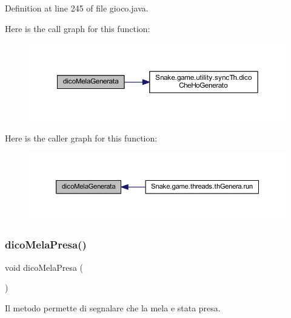 Definition at line 245 of file gioco.\+java.

Here is the call graph for this function\+:
\nopagebreak
\begin{figure}[H]
\begin{center}
\leavevmode
\includegraphics[width=350pt]{class_snake_1_1game_1_1gioco_a0de00fa3994a64cc918edd5944ac2569_cgraph}
\end{center}
\end{figure}
Here is the caller graph for this function\+:
\nopagebreak
\begin{figure}[H]
\begin{center}
\leavevmode
\includegraphics[width=350pt]{class_snake_1_1game_1_1gioco_a0de00fa3994a64cc918edd5944ac2569_icgraph}
\end{center}
\end{figure}
\mbox{\label{class_snake_1_1game_1_1gioco_a5309846aa7b0465c29959c51b0182ced}} 
\subsubsection{\texorpdfstring{dico\+Mela\+Presa()}{dicoMelaPresa()}}
{\footnotesize\ttfamily void dico\+Mela\+Presa (\begin{DoxyParamCaption}{ }\end{DoxyParamCaption})}



Il metodo permette di segnalare che la mela e\textquotesingle{} stata presa. 



